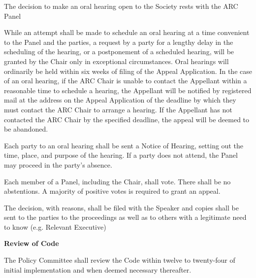 \begin{longenum}[ label*=\arabic*., align=left]
\begin{longenum}[ label*=\arabic*., align=left]
		\begin{longenum}[ label*=\arabic*., align=left]
			\item  The decision to make an oral hearing open to the Society rests with the ARC Panel
     	 \end{longenum}
	\item While an attempt shall be made to schedule an oral hearing at a time convenient to the Panel and  the  parties,  a  request  by  a  party  for  a  lengthy  delay  in  the  scheduling  of  the  hearing,  or  a postponement  of  a  scheduled  hearing,  will  be  granted  by  the  Chair  only  in  exceptional circumstances.  Oral  hearings  will  ordinarily  be  held  within  six  weeks  of  filing  of  the  Appeal Application.  In  the  case  of  an  oral  hearing,  if  the  ARC  Chair  is  unable  to  contact  the  Appellant within a reasonable time to schedule a hearing, the Appellant will be notified by registered mail at the  address  on  the  Appeal  Application  of  the  deadline  by  which  they must  contact  the  ARC Chair  to  arrange  a  hearing.  If  the  Appellant  has  not  contacted  the  ARC  Chair  by  the  specified deadline, the appeal will be deemed to be abandoned.
	\item Each party to an oral hearing shall be sent a Notice of Hearing, setting out the time, place, and  purpose  of  the  hearing.  If  a  party  does  not  attend,  the  Panel  may  proceed  in  the  party's absence.
    \item Each  member  of  a  Panel,  including  the  Chair,  shall  vote.  There  shall be  no  abstentions.  A majority of positive votes is required to grant an appeal.
	\item The  decision,  with  reasons,  shall  be  filed  with  the  Speaker  and  copies  shall  be  sent  to  the parties  to  the  proceedings  as  well  as  to  others  with  a  legitimate  need  to  know  (e.g.  Relevant Executive) 
      \end{longenum}
\item \textbf{Review of Code}

The Policy Committee shall review the Code within twelve to twenty-four of initial implementation and when deemed necessary thereafter.
\end{longenum}